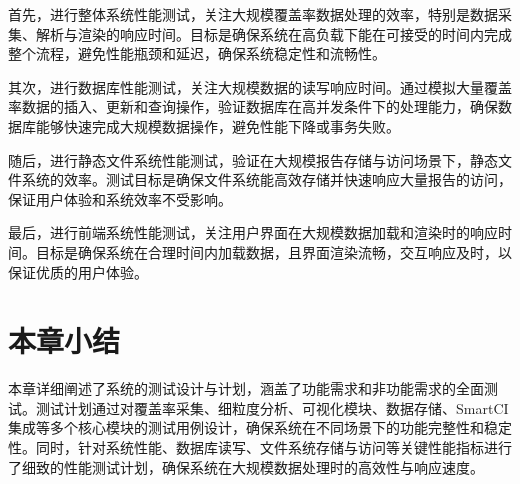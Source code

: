 首先，进行整体系统性能测试，关注大规模覆盖率数据处理的效率，特别是数据采集、解析与渲染的响应时间。目标是确保系统在高负载下能在可接受的时间内完成整个流程，避免性能瓶颈和延迟，确保系统稳定性和流畅性。

其次，进行数据库性能测试，关注大规模数据的读写响应时间。通过模拟大量覆盖率数据的插入、更新和查询操作，验证数据库在高并发条件下的处理能力，确保数据库能够快速完成大规模数据操作，避免性能下降或事务失败。

随后，进行静态文件系统性能测试，验证在大规模报告存储与访问场景下，静态文件系统的效率。测试目标是确保文件系统能高效存储并快速响应大量报告的访问，保证用户体验和系统效率不受影响。

最后，进行前端系统性能测试，关注用户界面在大规模数据加载和渲染时的响应时间。目标是确保系统在合理时间内加载数据，且界面渲染流畅，交互响应及时，以保证优质的用户体验。

\section{本章小结}
本章详细阐述了系统的测试设计与计划，涵盖了功能需求和非功能需求的全面测试。测试计划通过对覆盖率采集、细粒度分析、可视化模块、数据存储、SmartCI 集成等多个核心模块的测试用例设计，确保系统在不同场景下的功能完整性和稳定性。同时，针对系统性能、数据库读写、文件系统存储与访问等关键性能指标进行了细致的性能测试计划，确保系统在大规模数据处理时的高效性与响应速度。